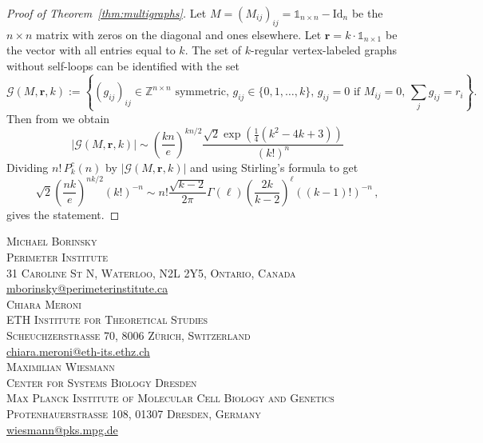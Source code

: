 \documentclass[a4paper,oneside]{amsart}
\newcommand{\bb}[1]{\boldsymbol{#1}}
\numberwithin{theorem}{section}
\theoremstyle{remark}
\newcommand{\GG}{\mathcal{G}}
\newcommand{\Z}{\mathbb{Z}}
\newcommand{\cE}{{P}}
\begin{document}
\begin{proof}[Proof of Theorem~\ref{thm:multigraphs}]
Let $M = (M_{ij})_{ij} = \mathbb{1}_{n\times n} - \mathrm{Id}_{n}$ be the $n\times n$ matrix with zeros on the diagonal and ones elsewhere. Let $\bb{r} = k\cdot \mathbb{1}_{n\times 1}$ be the vector with all entries equal to $k$. The set of $k$-regular vertex-labeled graphs without self-loops can be identified with the set
\[
  \GG(M,\bb{r},k) := \left\{ (g_{ij})_{ij} \in \Z^{n\times n} \text{ symmetric, } g_{ij}\in \{0,1,\dots,k\},\, g_{ij} = 0 \text{ if } M_{ij} = 0,\, \sum_j g_{ij} = r_i  \right\}.
\]
Then from \cite[Theorem 1]{bender1978asymptotic} 
we obtain
\[
  |\GG(M,\bb{r},k)| \sim \left( \frac{kn}{e} \right)^{kn/2} \frac{\sqrt{2} \exp\left( \frac{1}{4}(k^2 -4k +3) \right)}{(k!)^n} 
\]
Dividing $n!\, \cE^{c}_k(n)$ by $|\GG(M,\bb{r},k)|$ 
and using Stirling's formula to get 
\[
  \sqrt{2} \left( \frac{nk}{e} \right)^{nk/2} (k!)^{-n}
  \sim
  n! \frac{\sqrt{k-2}}{2\pi} \Gamma(\ell) \left(\frac{2k}{k-2}\right)^{\ell} ((k-1)!)^{-n} 
  \, ,
\]
gives the statement.
\end{proof}


\printbibliography

\vspace{1em}
\noindent \textsc{Michael Borinsky}\\
\textsc{Perimeter Institute}\\
\textsc{31 Caroline St N, Waterloo, N2L 2Y5, Ontario, Canada}\\
\url{mborinsky@perimeterinstitute.ca}\\

\noindent \textsc{Chiara Meroni}\\
\textsc{ETH Institute for Theoretical Studies}\\
\textsc{Scheuchzerstrasse 70, 8006 Zürich, Switzerland}\\
\url{chiara.meroni@eth-its.ethz.ch}\\

\noindent \textsc{Maximilian Wiesmann}\\
\textsc{Center for Systems Biology Dresden \\
Max Planck Institute of Molecular Cell Biology and Genetics\\
Pfotenhauerstrasse 108, 01307 Dresden, Germany}\\
\url{wiesmann@pks.mpg.de}
\end{document}
